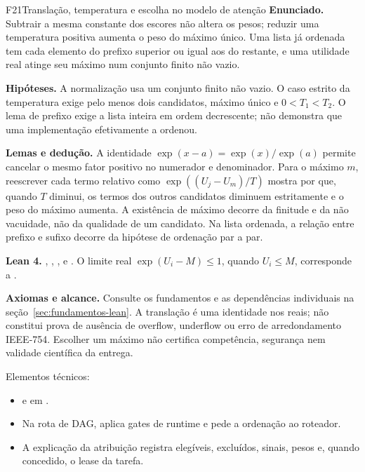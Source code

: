 \begin{formalizacao}{F21}{Translação, temperatura e escolha no modelo de atenção}
\textbf{Enunciado.} Subtrair a mesma constante dos escores não altera os
pesos; reduzir uma temperatura positiva aumenta o peso do máximo único.
Uma lista já ordenada tem cada elemento do prefixo superior ou igual aos
do restante, e uma utilidade real atinge seu máximo num conjunto finito
não vazio.

\textbf{Hipóteses.} A normalização usa um conjunto finito não vazio. O caso
estrito da temperatura exige pelo menos dois candidatos, máximo único e
$0<T_1<T_2$. O lema de prefixo exige a lista inteira em ordem decrescente;
não demonstra que uma implementação efetivamente a ordenou.

\textbf{Lemas e dedução.} A identidade
$\exp(x-a)=\exp(x)/\exp(a)$ permite cancelar o mesmo fator positivo no
numerador e denominador. Para o máximo $m$, reescrever cada termo relativo
como $\exp((U_j-U_m)/T)$ mostra por que, quando $T$ diminui, os termos dos
outros candidatos diminuem estritamente e o peso do máximo aumenta.
A existência de máximo decorre da finitude e da não vacuidade, não da
qualidade de um candidato. Na lista ordenada, a relação entre prefixo e
sufixo decorre da hipótese de ordenação par a par.

\textbf{Lean 4.} ,
,
,
 e
. O limite real
$\exp(U_i-M)\leq1$, quando $U_i\leq M$, corresponde a
.

\textbf{Axiomas e alcance.} Consulte os fundamentos e as dependências
individuais na seção~\ref{sec:fundamentos-lean}. A translação é uma
identidade nos reais; não constitui prova de ausência de overflow,
underflow ou erro de arredondamento IEEE-754. Escolher um máximo não
certifica competência, segurança nem validade científica da entrega.
\end{formalizacao}




\begin{arquitetura}
Elementos técnicos:
\begin{itemize}[leftmargin=1.3em,itemsep=1pt]
  \item {} e  em
        .
  \item Na rota de DAG,  aplica gates de runtime e pede
        a ordenação ao roteador.
  \item A explicação da atribuição registra elegíveis, excluídos, sinais, pesos
        e, quando concedido, o lease da tarefa.
\end{itemize}
\end{arquitetura}

